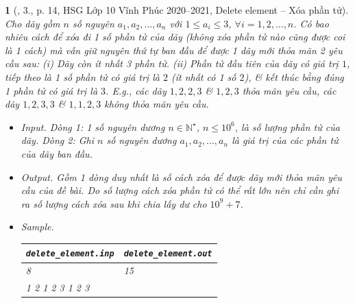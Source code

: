 \documentclass{article}
\newtheorem{baitoan}{}
\begin{document}
\begin{baitoan}[\cite{Trung_HSG_THPT_Tin}, 3., p. 14, HSG Lớp 10 Vĩnh Phúc 2020--2021, Delete element -- Xóa phần tử]
	Cho dãy gồm $n$ số nguyên $a_1,a_2,\ldots,a_n$ với $1\le a_i\le3$, $\forall i = 1,2,\ldots,n$. Có bao nhiêu cách để xóa đi 1 số phần tử của dãy (không xóa phần tử nào cũng được coi là 1 cách) mà vẫn giữ nguyên thứ tự ban đầu để được 1 dãy mới thỏa mãn 2 yêu cầu sau: (i) Dãy còn ít nhất 3 phần  tử. (ii) Phần tử đầu tiên của dãy có giá trị $1$, tiếp theo là 1 số phần tử có giá trị là $2$ (ít nhất có 1 số $2$), \& kết thúc bằng đúng 1 phần tử có giá trị là $3$. E.g., các dãy $1,2,2,3$ \& $1,2,3$ thỏa mãn yêu cầu, các dãy $1,2,3,3$ \& $1,1,2,3$ không thỏa mãn yêu cầu.
	\begin{itemize}
		\item {\sf Input.} Dòng 1: 1 số nguyên dương $n\in\mathbb{N}^\star$, $n\le10^6$, là số lượng phần tử của dãy. Dòng 2: Ghi $n$ số nguyên dương $a_1,a_2,\ldots,a_n$ là giá trị của các phần tử của dãy ban đầu.
		\item {\sf Output.} Gồm 1 dòng duy nhất là số cách xóa để được dãy mới thỏa mãn yêu cầu của đề bài. Do số lượng cách xóa phần tử có thể rất lớn nên chỉ cần ghi ra số lượng cách xóa sau khi chia lấy dư cho $10^9 + 7$.
		\item {\sf Sample.}
		\begin{table}[H]
			\centering
			\begin{tabular}{|l|l|}
				\hline
				\verb|delete_element.inp| & \verb|delete_element.out| \\
				\hline
				8 & 15 \\
				1 2 1 2 3 1 2 3 &  \\
				\hline
			\end{tabular}
		\end{table}
	\end{itemize}
\end{baitoan}
\end{document}
